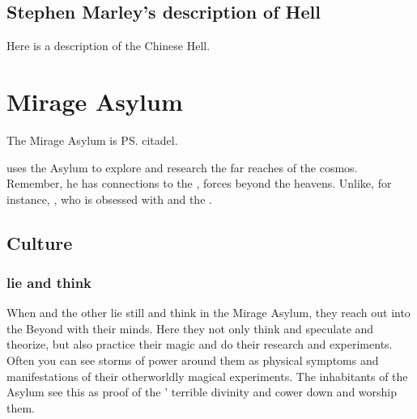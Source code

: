 \subsection{Stephen Marley's description of Hell}
Here is a description of the Chinese Hell.
















\section{Mirage Asylum}
The Mirage Asylum is \ps{\Ishnaruchaefir} citadel. 

\Ishnaruchaefir{} uses the Asylum to explore and research the far reaches of the cosmos. 
Remember, he has connections to the , forces beyond the heavens. 
Unlike, for instance, \Secherdamon, who is obsessed with \Machai{} and the \xss. 









\subsection{Culture}





\subsubsection{\Dragons lie and think}
When \Ishnaruchaefir and the other \dragons lie still and think in the Mirage Asylum, they reach out into the Beyond with their minds.
Here they not only think and speculate and theorize, but also practice their magic and do their research and experiments.
Often you can see storms of power around them as physical symptoms and manifestations of their otherworldly magical experiments.
The inhabitants of the Asylum see this as proof of the \dragons' terrible divinity and cower down and worship them.





